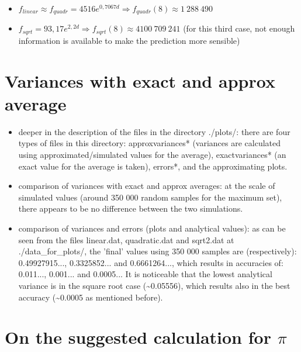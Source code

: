 \documentclass[paper=a4, fontsize=11pt]{scrartcl} %
\numberwithin{equation}{section} %
\numberwithin{figure}{section} %
\numberwithin{table}{section} %
\begin{document}
\begin{itemize}
\item $f_{linear} \approx f_{quadr} = 4516e^{0,7067d}\Rightarrow f_{quadr}(8) \approx 1 \ 288 \ 490 $
\item $f_{sqrt} = 93,17 e^{2,2 d} \Rightarrow f_{sqrt}(8) \approx 4100 \ 709 \ 241 $ (for this third case, not enough information is available to make the prediction more sensible)
\end{itemize}


\section{Variances with exact and approx average}


\begin{itemize}
\item deeper in the description of the files in the directory ./plots/: there are four types of files in this directory: approxvariances* (variances are calculated using approximated/simulated values for the average), exactvariances* (an exact value for the average is taken), errors*, and the approximating plots.
\item comparison of variances with exact and approx averages: at the scale of simulated values (around 350 000 random samples for the maximum set), there appears to be no difference between the two simulations.
\item comparison of variances and errors (plots and analytical values): as can be seen from the files linear.dat, quadratic.dat and sqrt2.dat at ./data\_for\_plots/, the 'final' values using 350 000 samples are (respectively): 0.49927915..., 0.3325852... and 0.6661264..., which results in accuracies of: 0.011..., 0.001... and 0.0005... It is noticeable that the lowest analytical variance is in the square root case (\textasciitilde 0.05556), which results also in the best accuracy (\textasciitilde 0.0005 as mentioned before).
\end{itemize}


\section{On the suggested calculation for $\pi$}

\end{document}
